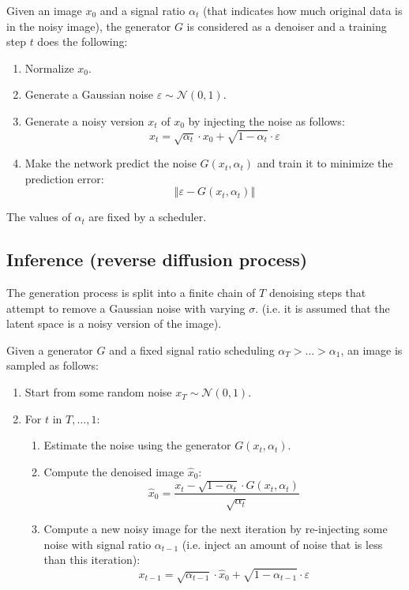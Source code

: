 Given an image $x_0$ and a signal ratio $\alpha_t$ (that indicates how much original data is in the noisy image),
the generator $G$ is considered as a denoiser and a training step $t$ does the following:
\begin{enumerate}
    \item Normalize $x_0$.
    \item Generate a Gaussian noise $\varepsilon \sim \mathcal{N}(0, 1)$.
    \item Generate a noisy version $x_t$ of $x_0$ by injecting the noise as follows:
        \[ x_t = \sqrt{\alpha_t} \cdot x_0 + \sqrt{1-\alpha_t} \cdot \varepsilon \]
    \item Make the network predict the noise $G(x_t, \alpha_t)$ and train it to minimize the prediction error:
        \[ \Vert \varepsilon - G(x_t, \alpha_t) \Vert \]
\end{enumerate}

\begin{remark}
    The values of $\alpha_t$ are fixed by a scheduler.
\end{remark}


\subsection{Inference (reverse diffusion process)}

The generation process is split into a finite chain of $T$ denoising steps that attempt to remove a Gaussian noise with varying $\sigma$.
(i.e. it is assumed that the latent space is a noisy version of the image).

Given a generator $G$ and a fixed signal ratio scheduling $\alpha_T > \dots > \alpha_1$, an image is sampled as follows:
\begin{enumerate}
    \item Start from some random noise $x_T \sim \mathcal{N}(0, 1)$.
    \item For $t$ in $T, \dots, 1$:
    \begin{enumerate}
        \item Estimate the noise using the generator $G(x_t, \alpha_t)$.
        \item Compute the denoised image $\hat{x}_0$:
            \[ \hat{x}_0 = \frac{x_t - \sqrt{1-\alpha_t} \cdot G(x_t, \alpha_t)}{\sqrt{\alpha_t}} \]
        \item Compute a new noisy image for the next iteration by re-injecting some noise with signal ratio $\alpha_{t-1}$ (i.e. inject an amount of noise that is less than this iteration):
            \[ x_{t-1} = \sqrt{\alpha_{t-1}} \cdot \hat{x}_0 + \sqrt{1 - \alpha_{t-1}} \cdot \varepsilon \]
    \end{enumerate}
\end{enumerate}

